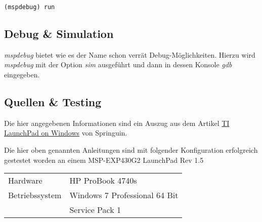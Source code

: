 \verb?(mspdebug) run?

\subsection{Debug \& Simulation}
\emph{mspdebug} bietet wie es der Name schon verrät Debug-Möglichkeiten.
Hierzu wird \emph{mspdebug} mit der Option \emph{sim} ausgeführt und
dann in dessen Konsole \emph{gdb} eingegeben.

\subsection{Quellen \& Testing}
Die hier angegebenen Informationen sind ein Auszug aus dem Artikel
\href{http://springuin.nl/articles/launchpadwindows}{TI LaunchPad on Windows} 
von Springuin. 

Die hier oben genannten Anleitungen sind mit folgender Konfiguration
erfolgreich gestestet worden an einem MSP-EXP430G2 LaunchPad Rev 1.5

\begin{table}[h!]
\centering
\begin{tabular}{ l l }
Hardware        & HP ProBook 4740s \\
Betriebssystem  & Windows 7 Professional 64 Bit \\
                & Service Pack 1 \\
\end{tabular}
\end{table}

